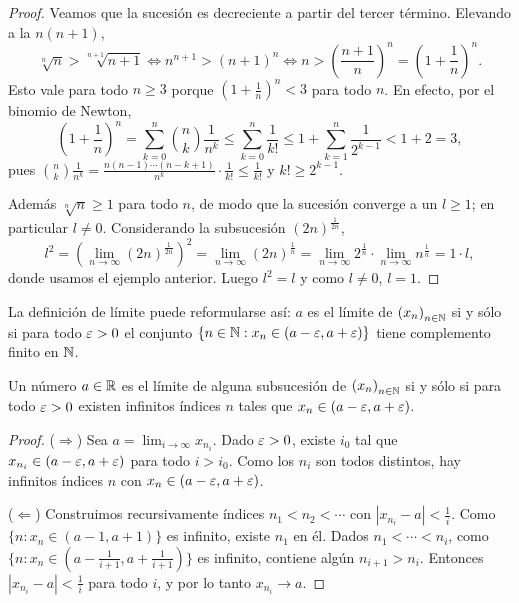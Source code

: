 \begin{proof}
  Veamos que la sucesión es decreciente a partir del tercer término. Elevando a la \(n(n+1)\),
  \[
    \sqrt[n]{n} > \sqrt[n+1]{n+1} \iff n^{n+1} > {(n+1)}^n \iff n > {\left( \frac{n+1}{n} \right)}^n = {\left( 1 + \frac{1}{n} \right)}^n.
  \]
  Esto vale para todo \(n \geq 3\) porque \({(1 + \frac{1}{n})}^n < 3\) para todo \(n\). En efecto, por el binomio de Newton,
  \[
    {\left( 1 + \frac{1}{n} \right)}^n = \sum_{k=0}^{n} \binom{n}{k} \frac{1}{n^k} \leq \sum_{k=0}^{n} \frac{1}{k!} \leq 1 + \sum_{k=1}^{n} \frac{1}{2^{k-1}} < 1 + 2 = 3,
  \]
  pues \(\binom{n}{k} \frac{1}{n^k} = \frac{n (n-1) \cdots (n-k+1)}{n^k} \cdot \frac{1}{k!} \leq \frac{1}{k!}\) y \(k! \geq 2^{k-1}\).

  Además \(\sqrt[n]{n} \geq 1\) para todo \(n\), de modo que la sucesión converge a un \(l \geq 1\); en particular \(l \neq 0\). Considerando la subsucesión \({(2n)}^{\frac{1}{2n}}\),
  \[
    l^2 = {\left( \lim_{n \to \infty} {(2n)}^{\frac{1}{2n}} \right)}^2 = \lim_{n \to \infty} {(2n)}^{\frac{1}{n}} = \lim_{n \to \infty} 2^{\frac{1}{n}} \cdot \lim_{n \to \infty} n^{\frac{1}{n}} = 1 \cdot l,
  \]
  donde usamos el ejemplo anterior. Luego \(l^2 = l\) y como \(l \neq 0\), \(l = 1\).
\end{proof}

\begin{note}
  La definición de límite puede reformularse así: \(a\) es el límite de \({(x_n)}_{n \in \mathbb{N}}\) si y sólo si para todo \(\varepsilon > 0\) el conjunto \(\{ n \in \mathbb{N} : x_n \in (a - \varepsilon, a + \varepsilon) \}\) tiene complemento finito en \(\mathbb{N}\).
\end{note}

\begin{theorem}
  Un número \(a \in \mathbb{R}\) es el límite de alguna subsucesión de \({(x_n)}_{n \in \mathbb{N}}\) si y sólo si para todo \(\varepsilon > 0\) existen infinitos índices \(n\) tales que \(x_n \in (a - \varepsilon, a + \varepsilon)\).
\end{theorem}

\begin{proof}
  (\(\Rightarrow\)) Sea \(a = \lim_{i \to \infty} x_{n_i}\). Dado \(\varepsilon > 0\), existe \(i_0\) tal que \(x_{n_i} \in (a - \varepsilon, a + \varepsilon)\) para todo \(i > i_0\). Como los \(n_i\) son todos distintos, hay infinitos índices \(n\) con \(x_n \in (a - \varepsilon, a + \varepsilon)\).

  (\(\Leftarrow\)) Construimos recursivamente índices \(n_1 < n_2 < \cdots\) con \(|x_{n_i} - a| < \frac{1}{i}\). Como \(\{ n : x_n \in (a - 1, a + 1) \}\) es infinito, existe \(n_1\) en él. Dados \(n_1 < \cdots < n_i\), como \(\{ n : x_n \in (a - \frac{1}{i+1}, a + \frac{1}{i+1}) \}\) es infinito, contiene algún \(n_{i+1} > n_i\). Entonces \(|x_{n_i} - a| < \frac{1}{i}\) para todo \(i\), y por lo tanto \(x_{n_i} \to a\).
\end{proof}

